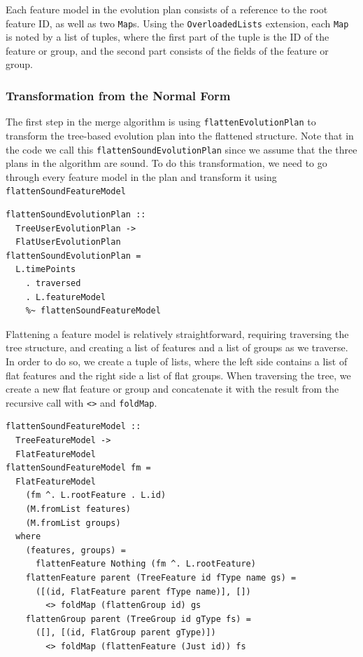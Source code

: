 \documentclass[a4paper,english]{ifimaster}
\begin{document}
Each feature model in the evolution plan consists of a reference to the root feature ID, as well as two \texttt{Map}s. Using the \texttt{OverloadedLists} extension, each \texttt{Map} is noted by a list of tuples, where the first part of the tuple is the ID of the feature or group, and the second part consists of the fields of the feature or group.

\subsubsection{Transformation from the Normal Form}%
\label{ssub:transformation_from_the_normal_form}

The first step in the merge algorithm is using \texttt{flatten\-Evolution\-Plan} to transform the tree-based evolution plan into the flattened structure. Note that in the code we call this \texttt{flatten\-Sound\-Evolution\-Plan} since we assume that the three plans in the algorithm are sound. To do this transformation, we need to go through every feature model in the plan and transform it using \texttt{flatten\-Sound\-Feature\-Model}

\begin{verbatim}
flattenSoundEvolutionPlan :: 
  TreeUserEvolutionPlan -> 
  FlatUserEvolutionPlan
flattenSoundEvolutionPlan =
  L.timePoints
    . traversed
    . L.featureModel
    %~ flattenSoundFeatureModel
\end{verbatim}

Flattening a feature model is relatively straightforward, requiring traversing the tree structure, and creating a list of features and a list of groups as we traverse. In order to do so, we create a tuple of lists, where the left side contains a list of flat features and the right side a list of flat groups. When traversing the tree, we create a new flat feature or group and concatenate it with the result from the recursive call with \texttt{<>} and \texttt{foldMap}.

\begin{verbatim}
flattenSoundFeatureModel :: 
  TreeFeatureModel -> 
  FlatFeatureModel
flattenSoundFeatureModel fm =
  FlatFeatureModel
    (fm ^. L.rootFeature . L.id)
    (M.fromList features)
    (M.fromList groups)
  where
    (features, groups) = 
      flattenFeature Nothing (fm ^. L.rootFeature)
    flattenFeature parent (TreeFeature id fType name gs) =
      ([(id, FlatFeature parent fType name)], [])
        <> foldMap (flattenGroup id) gs
    flattenGroup parent (TreeGroup id gType fs) =
      ([], [(id, FlatGroup parent gType)])
        <> foldMap (flattenFeature (Just id)) fs
\end{verbatim}
\end{document}
